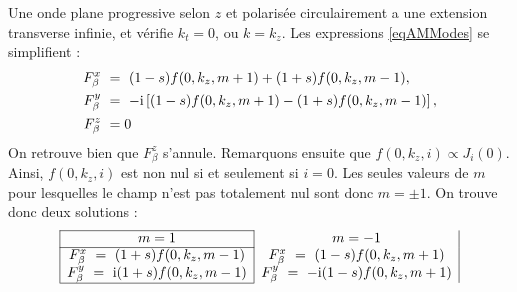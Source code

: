 Une onde plane progressive selon $z$ et polarisée circulairement a une extension transverse infinie, et vérifie $k_t = 0$, ou $k = k_z$. Les expressions \ref{eqAMModes} se simplifient :
\begin{equation}
\begin{aligned}
F_{\beta}^x ~&= ~(1-s)f(0,k_z,m+1)+(1+s)f(0,k_z,m-1),\\
F_{\beta}^y ~&= ~-\mathrm{i}\left[(1-s)f(0,k_z,m+1)-(1+s)f(0,k_z,m-1)\right],\\
F_{\beta}^z ~&= 0
\end{aligned}
\end{equation}
On retrouve bien que $F_{\beta}^z$ s'annule. Remarquons ensuite que $f(0,k_z,i) \propto J_i(0)$. Ainsi, $f(0,k_z,i)$ est non nul si et seulement si $i = 0$. Les seules valeurs de $m$ pour lesquelles le champ n'est pas totalement nul sont donc $m=\pm 1$. On trouve donc deux solutions :
\[
\begin{array}{|c|c|}
	\hline
	m = 1 &m = -1 \\
	\hline
	F_{\beta}^x ~= ~(1+s)f(0,k_z,m-1) & F_{\beta}^x ~= ~(1-s)f(0,k_z,m+1)\\
		F_{\beta}^y ~= ~\rmi(1+s)f(0,k_z,m-1) & F_{\beta}^y ~= ~-\rmi(1-s)f(0,k_z,m+1)\\
		\hline
\end{array}\]

